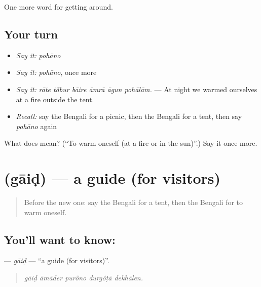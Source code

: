 \begin{grammarlens}[title={What you've built}]
One more word for getting around.
\end{grammarlens}

\subsection*{Your turn}
\begin{itemize}
\raggedright
  \item \emph{Say it:} \emph{pohāno}
  \item \emph{Say it:} \emph{pohāno}, once more
  \item \emph{Say it:} \emph{rāte tā̃bur bāire āmrā āgun pohālām.} — At night we warmed ourselves at a fire outside the tent.
  \item \emph{Recall:} say the Bengali for a picnic, then the Bengali for a tent, then say \emph{pohāno} again
\end{itemize}

\begin{tcolorbox}[breakable,colback=teal!4,colframe=teal!35!black,title={Before you move on}]
What does  mean? (\textquotedblleft{}To warm oneself (at a fire or in the sun)\textquotedblright{}.) Say it once more.
\end{tcolorbox}
\section[\texorpdfstring{\bn{গাইড} (gāiḍ)}{গাইড (gāiḍ)}]{ (gāiḍ) — a guide (for visitors)}

\label{lesson:BN-C399-gaid}



\begin{quote}
Before the new one: say the Bengali for a tent, then the Bengali for to warm oneself.
\end{quote}

\subsection*{You'll want to know: }
\textbf{} — \emph{gāiḍ} — \textquotedblleft{}a guide (for visitors)\textquotedblright{}.

\begin{quote}
    
\end{quote}

\begin{quote}
\emph{gāiḍ āmāder purôno durgôṭā dekhālen.}
\end{quote}


